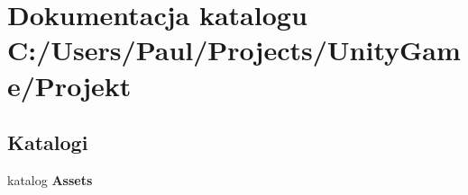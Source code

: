 \section{Dokumentacja katalogu C\+:/\+Users/\+Paul/\+Projects/\+Unity\+Game/\+Projekt}
\label{dir_d3cf73078ef332d2a7ff606350eca3a1}
\subsection*{Katalogi}
\begin{DoxyCompactItemize}
\item 
katalog {\bf Assets}
\end{DoxyCompactItemize}
